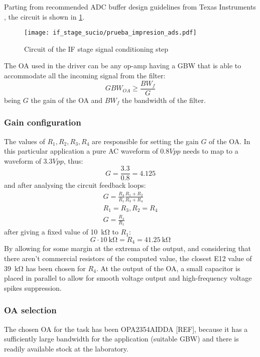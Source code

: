 Parting from recommended ADC buffer design guidelines from Texas Instruments \cite[p.~17]{TexasInstruments2022}, the circuit is shown in \cref{fig:if_cir}.

\begin{figure}[h]
	\centering
	\texttt{[image: if\_stage\_sucio/prueba\_impresion\_ads.pdf]}
	\caption{Circuit of the IF stage signal conditioning step}
	\label{fig:if_cir}
\end{figure}

The OA used in the driver can be any op-amp having a GBW that is able to accommodate all the incoming signal from the filter:
\begin{equation}
	GBW_{OA} \ge \frac{BW_{f}}{G}
\end{equation}
being $G$ the gain of the OA and $BW_{f}$ the bandwidth of the filter.


\subsubsection{Gain configuration}
The values of $R_1, R_2, R_3, R_4$ are responsible for setting the gain $G$ of the OA.
In this particular application a pure AC waveform of $0.8 Vpp$ needs to map to a waveform of $3.3 Vpp$, thus:
\begin{equation}
	G = \frac{3.3}{0.8} = 4.125
\end{equation}
and after analysing the circuit feedback loops:
\begin{gather}
	G = \frac{R_4}{R_1} \frac{R_1+R_2}{R_3+R_4}\\
	R_1 = R_3, R_2=R_4\\
	G= \frac{R_4}{R_1}
\end{gather}
after giving a fixed value of \SI{10}{\kilo\ohm} to $R_1$:
\begin{equation}
	G \cdot \SI{10}{\kilo\ohm} = R_4 = \SI{41.25}{\kilo\ohm}
\end{equation}
By allowing for some margin at the extrema of the output, and considering that there aren't commercial resistors of the computed value, the closest E12 value of \SI{39}{\kilo\ohm} has been chosen for $R_4$.
At the output of the OA, a small capacitor is placed in parallel to allow for smooth voltage output and high-frequency voltage spikes suppression.

\subsubsection{OA selection}
The chosen OA for the task has been OPA2354AIDDA [REF], because it has a sufficiently large bandwidth for the application (suitable GBW) and there is readily available stock at the laboratory.

